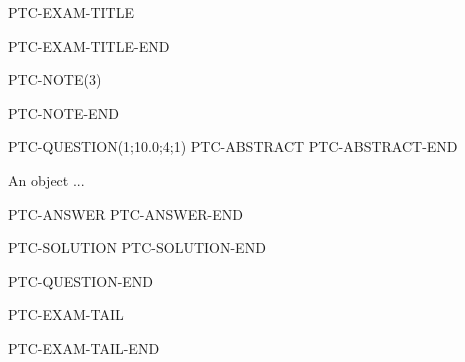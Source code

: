 \documentclass[12pt]{article}
\begin{document}
PTC-EXAM-TITLE

PTC-EXAM-TITLE-END



PTC-NOTE(3)

PTC-NOTE-END


PTC-QUESTION(1;10.0;4;1)
PTC-ABSTRACT
PTC-ABSTRACT-END

An object ...

PTC-ANSWER
PTC-ANSWER-END

PTC-SOLUTION
PTC-SOLUTION-END

\vspace{0.3in}
PTC-QUESTION-END




PTC-EXAM-TAIL

PTC-EXAM-TAIL-END
\end{document}
